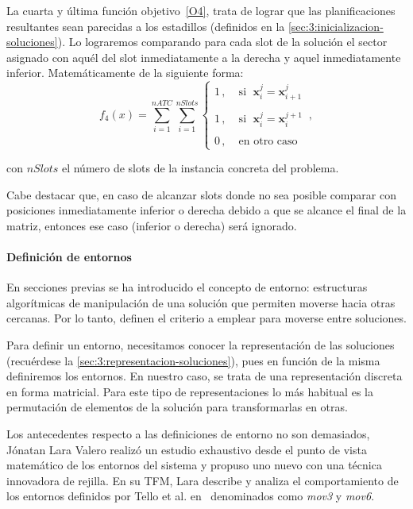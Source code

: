 La cuarta y última función objetivo~\ref{O4}, trata de lograr que las planificaciones resultantes sean parecidas a los estadillos (definidos en la \autoref{sec:3:inicializacion-soluciones}). Lo lograremos comparando para cada slot de la solución el sector asignado con aquél del slot inmediatamente a la derecha y aquel inmediatamente inferior. Matemáticamente de la siguiente forma:
%
\[
    f_4(x) = \sum_{i=1}^{nATC} \sum_{i=1}^{nSlots}
    \begin{cases}
        1\,, & \; \textrm{si } \; \textbf{x}_i^j = \textbf{x}_{i+1}^{j} \\
        \\
        1\,, & \; \textrm{si } \; \textbf{x}_i^j = \textbf{x}_{i}^{j+1}   \\
        \\
        0\,, & \; \textrm{en otro caso }
    \end{cases}
    \,,
\]

con $nSlots$ el número de slots de la instancia concreta del problema. 

Cabe destacar que, en caso de alcanzar slots
donde no sea posible comparar con posiciones inmediatamente inferior o derecha debido a que se alcance el final de la matriz, entonces ese caso (inferior o derecha) será ignorado.

\paragraph{Definición de entornos} \label{paragraph:entornos}
En secciones previas se ha introducido el concepto de entorno: estructuras algorítmicas de manipulación de una solución que permiten moverse hacia otras cercanas. Por lo tanto, definen el criterio a emplear para moverse entre soluciones.

Para definir un entorno, necesitamos conocer la representación de las soluciones (recuérdese la \autoref{sec:3:representacion-soluciones}), pues en función de la misma definiremos los entornos. En nuestro caso, se trata de una representación discreta en forma matricial. Para este tipo de representaciones lo más habitual es la permutación de elementos de la solución para transformarlas en otras.

Los antecedentes respecto a las definiciones de entorno no son demasiados, Jónatan Lara Valero realizó un estudio exhaustivo desde el punto de vista matemático de los entornos del sistema \legacy{} y propuso uno nuevo con una técnica innovadora de rejilla. En su TFM, Lara describe y analiza el comportamiento de los entornos definidos por Tello et al. en~\cite{articulo1} denominados como \textit{mov3} y \textit{mov6}.

